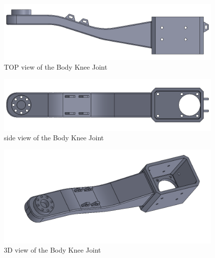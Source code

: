 \begin{figure}[h]
	\centering
	\includegraphics[width=1\linewidth]{Body_Knee_Joint_1}
	\caption[TOP view of the Body Knee Joint]{TOP view of the Body Knee Joint}
	\label{fig:bodykneejoint1}
\end{figure}
\begin{figure}[h]
	\centering
	\includegraphics[width=1\linewidth]{Body_Knee_Joint_2}
	\caption[Side view of the Body Knee Joint]{side view of the Body Knee Joint}
	\label{fig:bodykneejoint2}
\end{figure}
\begin{figure}[h]
	\centering
	\includegraphics[width=1\linewidth]{Body_Knee_Joint_3}
	\caption[3D view of the Body Knee Joint]{3D view of the Body Knee Joint}
	\label{fig:bodykneejoint3}
\end{figure}
